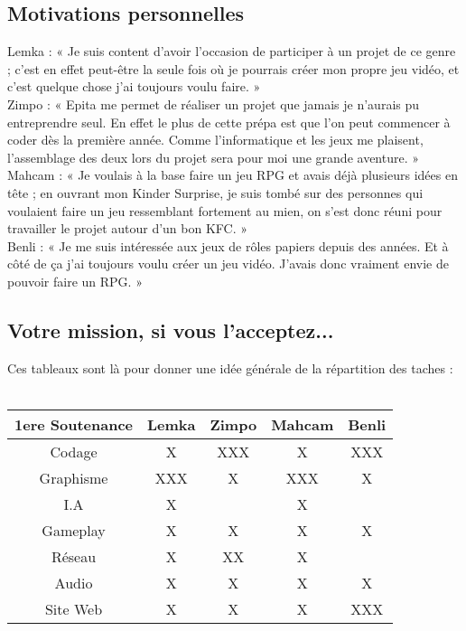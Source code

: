 \documentclass[12pt]{article}
\begin{document}
\subsection{Motivations personnelles}

Lemka : « Je suis content d’avoir l’occasion de participer à un projet de ce genre ; c’est en effet peut-être la seule fois où je pourrais créer mon propre jeu vidéo, et c’est quelque chose j’ai toujours voulu faire. »\\

Zimpo : « Epita me permet de réaliser un projet que jamais je n’aurais pu entreprendre seul. En effet le plus de cette prépa est que l’on peut commencer à coder dès la première année. Comme l’informatique et les jeux me plaisent, l’assemblage des deux lors du projet sera pour moi une grande aventure. »\\

Mahcam : « Je voulais à la base faire un jeu RPG et avais déjà plusieurs idées en tête ; en ouvrant mon Kinder Surprise, je suis tombé sur des personnes qui voulaient faire un jeu ressemblant fortement au mien, on s’est donc réuni pour travailler le projet autour d’un bon KFC. »\\

Benli : « Je me suis intéressée aux jeux de rôles papiers depuis des années. Et à côté de ça j’ai toujours voulu créer un jeu vidéo. J’avais donc vraiment envie de pouvoir faire un RPG. »

\subsection{Votre mission, si vous l'acceptez...}

Ces tableaux sont là pour donner une idée générale de la répartition des taches :\\\\

\begin{tabular}{|c|c|c|c|c|}
\hline
1ere Soutenance & Lemka & Zimpo & Mahcam & Benli\\ \hline
Codage & X & XXX & X & XXX \\ \hline
Graphisme & XXX & X & XXX & X \\ \hline
I.A & X & & X & \\ \hline
Gameplay & X & X & X & X \\ \hline
Réseau & X & XX & X & \\ \hline
Audio & X & X & X & X \\ \hline
Site Web & X & X & X & XXX \\ \hline
\end{tabular}\\\\\\
\end{document}
